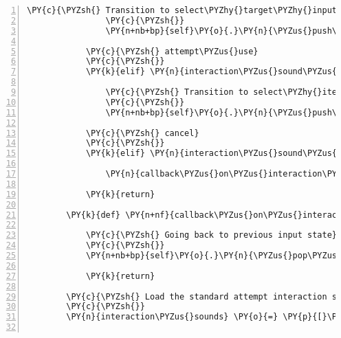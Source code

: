 \begin{Verbatim}[commandchars=\\\{\},numbers=left,firstnumber=1,stepnumber=1]
                \PY{c}{\PYZsh{} Transition to select\PYZhy{}target\PYZhy{}input\PYZhy{}state}
                \PY{c}{\PYZsh{}}
                \PY{n+nb+bp}{self}\PY{o}{.}\PY{n}{\PYZus{}push\PYZus{}input\PYZus{}state\PYZus{}on\PYZus{}stack}\PY{p}{(}\PY{n+nb+bp}{self}\PY{o}{.}\PY{n}{INPUT\PYZus{}STATE\PYZus{}SELECT\PYZus{}TARGET}\PY{p}{)}

            \PY{c}{\PYZsh{} attempt\PYZus{}use}
            \PY{c}{\PYZsh{}}
            \PY{k}{elif} \PY{n}{interaction\PYZus{}sound\PYZus{}menu}\PY{o}{.}\PY{n}{list\PYZus{}index} \PY{o}{==} \PY{n+nb+bp}{self}\PY{o}{.}\PY{n}{ATTEMPT\PYZus{}USE}\PY{p}{:}

                \PY{c}{\PYZsh{} Transition to select\PYZhy{}item\PYZhy{}input\PYZhy{}state}
                \PY{c}{\PYZsh{}}
                \PY{n+nb+bp}{self}\PY{o}{.}\PY{n}{\PYZus{}push\PYZus{}input\PYZus{}state\PYZus{}on\PYZus{}stack}\PY{p}{(}\PY{n+nb+bp}{self}\PY{o}{.}\PY{n}{INPUT\PYZus{}STATE\PYZus{}SELECT\PYZus{}ITEM}\PY{p}{)}

            \PY{c}{\PYZsh{} cancel}
            \PY{c}{\PYZsh{}}
            \PY{k}{elif} \PY{n}{interaction\PYZus{}sound\PYZus{}menu}\PY{o}{.}\PY{n}{list\PYZus{}index} \PY{o}{==} \PY{n+nb+bp}{self}\PY{o}{.}\PY{n}{CANCEL}\PY{p}{:}

                \PY{n}{callback\PYZus{}on\PYZus{}interaction\PYZus{}menu\PYZus{}exit}\PY{p}{(}\PY{n}{interaction\PYZus{}sound\PYZus{}menu}\PY{p}{)}

            \PY{k}{return}

        \PY{k}{def} \PY{n+nf}{callback\PYZus{}on\PYZus{}interaction\PYZus{}menu\PYZus{}exit}\PY{p}{(}\PY{n}{interaction\PYZus{}sound\PYZus{}menu}\PY{p}{)}\PY{p}{:}

            \PY{c}{\PYZsh{} Going back to previous input state}
            \PY{c}{\PYZsh{}}
            \PY{n+nb+bp}{self}\PY{o}{.}\PY{n}{\PYZus{}pop\PYZus{}input\PYZus{}state\PYZus{}from\PYZus{}stack}\PY{p}{(}\PY{p}{)}

            \PY{k}{return}

        \PY{c}{\PYZsh{} Load the standard attempt interaction sounds}
        \PY{c}{\PYZsh{}}
        \PY{n}{interaction\PYZus{}sounds} \PY{o}{=} \PY{p}{[}\PY{p}{]}


\end{Verbatim}
